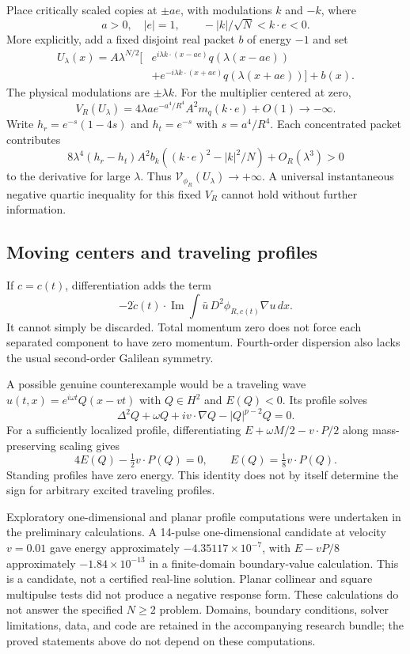\documentclass[11pt,a4paper]{article}
\theoremstyle{remark}\newtheorem{remark}[theorem]{Remark}
\newcommand{\dd}{\,dx}
\DeclareMathOperator{\Ima}{Im}
\begin{document}
Place critically scaled copies at $\pm ae$, with modulations $k$ and $-k$, where
\[
 a>0,\quad |e|=1,\qquad -|k|/\sqrt N<k\cdot e<0.
\]
More explicitly, add a fixed disjoint real packet $b$ of energy $-1$ and set
\begin{align*}
 U_\lambda(x)=A\lambda^{N/2}\big[&e^{i\lambda k\cdot(x-ae)}q(\lambda(x-ae))\\
 &+e^{-i\lambda k\cdot(x+ae)}q(\lambda(x+ae))\big]+b(x).
\end{align*}
The physical modulations are $\pm\lambda k$. For the multiplier centered at zero,
\[
 V_R(U_\lambda)=4\lambda a e^{-a^4/R^4}A^2m_q(k\cdot e)+O(1)\to-\infty.
\]
Write $h_r=e^{-s}(1-4s)$ and $h_t=e^{-s}$ with $s=a^4/R^4$. Each concentrated packet contributes
\[
 8\lambda^4(h_r-h_t)A^2b_k
 \left((k\cdot e)^2-|k|^2/N\right)+O_R(\lambda^3)>0
\]
to the derivative for large $\lambda$. Thus $\mathcal V_{\phi_R}(U_\lambda)\to+\infty$. A universal instantaneous negative quartic inequality for this fixed $V_R$ cannot hold without further information.

\subsection{Moving centers and traveling profiles}
If $c=c(t)$, differentiation adds the term
\[
 -2\dot c(t)\cdot\Ima\int\bar u\,D^2\phi_{R,c(t)}\nabla u\dd.
\]
It cannot simply be discarded. Total momentum zero does not force each separated component to have zero momentum. Fourth-order dispersion also lacks the usual second-order Galilean symmetry.

A possible genuine counterexample would be a traveling wave
$u(t,x)=e^{i\omega t}Q(x-vt)$ with $Q\in H^2$ and $E(Q)<0$. Its profile solves
\[
 \Delta^2Q+\omega Q+i v\cdot\nabla Q-|Q|^{p-2}Q=0.
\]
For a sufficiently localized profile, differentiating
$E+\omega M/2-v\cdot P/2$ along mass-preserving scaling gives
\[
 4E(Q)-\tfrac12v\cdot P(Q)=0,
 \qquad E(Q)=\tfrac18v\cdot P(Q).
\]
Standing profiles have zero energy. This identity does not by itself determine the sign for arbitrary excited traveling profiles.

Exploratory one-dimensional and planar profile computations were undertaken in the preliminary calculations. A 14-pulse one-dimensional candidate at velocity $v=0.01$ gave energy approximately $-4.35117\times10^{-7}$, with $E-vP/8$ approximately $-1.84\times10^{-13}$ in a finite-domain boundary-value calculation. This is a candidate, not a certified real-line solution. Planar collinear and square multipulse tests did not produce a negative response form. These calculations do not answer the specified $N\ge2$ problem. Domains, boundary conditions, solver limitations, data, and code are retained in the accompanying research bundle; the proved statements above do not depend on these computations.
\end{document}
